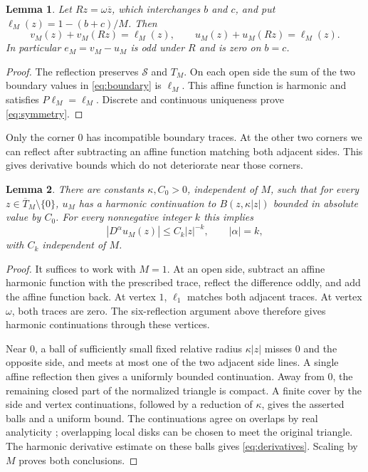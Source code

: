 \documentclass[11pt]{article}
\newtheorem{lemma}{Lemma}
\newcommand{\Sset}{\mathcal S}
\begin{document}
\begin{lemma}\label{lem:symmetry}
Let $Rz=\omega\overline z$, which interchanges $b$ and $c$, and put
$\ell_M(z)=1-(b+c)/M$. Then
\begin{equation}\label{eq:symmetry}
 v_M(z)+v_M(Rz)=\ell_M(z),\qquad
 u_M(z)+u_M(Rz)=\ell_M(z).
\end{equation}
In particular $e_M=v_M-u_M$ is odd under $R$ and is zero on $b=c$.
\end{lemma}
\begin{proof}
The reflection preserves $\Sset$ and $T_M$. On each open side the sum of the
two boundary values in \eqref{eq:boundary} is $\ell_M$.
This affine function is harmonic and satisfies $P\ell_M=\ell_M$.
Discrete and continuous uniqueness prove \eqref{eq:symmetry}.
\end{proof}

Only the corner $0$ has incompatible boundary traces. At the other two
corners we can reflect after subtracting an affine function matching both
adjacent sides. This gives derivative bounds which do not deteriorate near
those corners.

\begin{lemma}\label{lem:derivatives}
There are constants $\kappa,C_0>0$, independent of $M$, such that for every
$z\in\overline T_M\setminus\{0\}$, $u_M$ has a harmonic continuation to
$B(z,\kappa|z|)$ bounded in absolute value by $C_0$.
For every nonnegative integer $k$ this implies
\begin{equation}\label{eq:derivatives}
 |D^\alpha u_M(z)|\le C_k|z|^{-k},\qquad |\alpha|=k,
\end{equation}
with $C_k$ independent of $M$.
\end{lemma}
\begin{proof}
It suffices to work with $M=1$. At an open side, subtract an affine harmonic
function with the prescribed trace, reflect the difference oddly, and add the
affine function back. At vertex $1$, $\ell_1$ matches both adjacent traces.
At vertex $\omega$, both traces are zero. The six-reflection argument above
therefore gives harmonic continuations through these vertices.

Near $0$, a ball of sufficiently small fixed relative radius $\kappa|z|$
misses $0$ and the opposite side, and meets at most one of the two adjacent
side lines. A single affine reflection then gives a uniformly bounded
continuation. Away from $0$, the remaining closed part of the normalized
triangle is compact. A finite cover by the side and vertex continuations,
followed by a reduction of $\kappa$, gives the asserted balls and a uniform
bound. The continuations agree on overlaps by real analyticity
\cite[Theorems 1.27--1.28]{HFT}; overlapping local disks can be chosen to meet
the original triangle. The harmonic derivative estimate on these balls gives
\eqref{eq:derivatives}. Scaling by $M$ proves both conclusions.
\end{proof}
\end{document}
